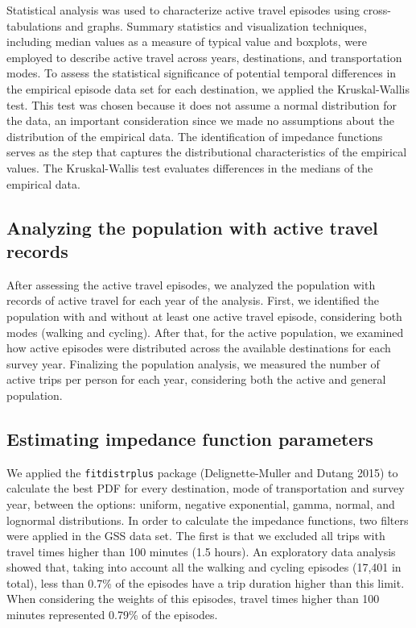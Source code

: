 \documentclass[preprint, 3p,
authoryear]{elsarticle} %
\begin{document}
Statistical analysis was used to characterize active travel episodes
using cross-tabulations and graphs. Summary statistics and visualization
techniques, including median values as a measure of typical value and
boxplots, were employed to describe active travel across years,
destinations, and transportation modes. To assess the statistical
significance of potential temporal differences in the empirical episode
data set for each destination, we applied the Kruskal-Wallis test. This
test was chosen because it does not assume a normal distribution for the
data, an important consideration since we made no assumptions about the
distribution of the empirical data. The identification of impedance
functions serves as the step that captures the distributional
characteristics of the empirical values. The Kruskal-Wallis test
evaluates differences in the medians of the empirical data.

\subsection{Analyzing the population with active travel
records}\label{analyzing-the-population-with-active-travel-records}

After assessing the active travel episodes, we analyzed the population
with records of active travel for each year of the analysis. First, we
identified the population with and without at least one active travel
episode, considering both modes (walking and cycling). After that, for
the active population, we examined how active episodes were distributed
across the available destinations for each survey year. Finalizing the
population analysis, we measured the number of active trips per person
for each year, considering both the active and general population.

\subsection{Estimating impedance function
parameters}\label{estimating-impedance-function-parameters}

We applied the \texttt{fitdistrplus} package (Delignette-Muller and
Dutang 2015) to calculate the best PDF for every destination, mode of
transportation and survey year, between the options: uniform, negative
exponential, gamma, normal, and lognormal distributions. In order to
calculate the impedance functions, two filters were applied in the GSS
data set. The first is that we excluded all trips with travel times
higher than 100 minutes (1.5 hours). An exploratory data analysis showed
that, taking into account all the walking and cycling episodes (17,401
in total), less than 0.7\% of the episodes have a trip duration higher
than this limit. When considering the weights of this episodes, travel
times higher than 100 minutes represented 0.79\% of the episodes.
\end{document}
